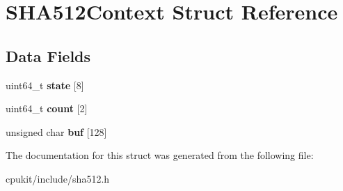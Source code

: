 \hypertarget{structSHA512Context}{}\section{S\+H\+A512\+Context Struct Reference}
\label{structSHA512Context}
\subsection*{Data Fields}
\begin{DoxyCompactItemize}
\item 
\mbox{\label{structSHA512Context_a5c0c4b3e4f9fd231bfdd0c700a846282}} 
uint64\+\_\+t {\bfseries state} \mbox{[}8\mbox{]}
\item 
\mbox{\label{structSHA512Context_a700e8f9534190fcfdc557e6c1d0a9e82}} 
uint64\+\_\+t {\bfseries count} \mbox{[}2\mbox{]}
\item 
\mbox{\label{structSHA512Context_a49ebf97d14415dc49f764df077fa7ae4}} 
unsigned char {\bfseries buf} \mbox{[}128\mbox{]}
\end{DoxyCompactItemize}


The documentation for this struct was generated from the following file\+:\begin{DoxyCompactItemize}
\item 
cpukit/include/sha512.\+h\end{DoxyCompactItemize}
